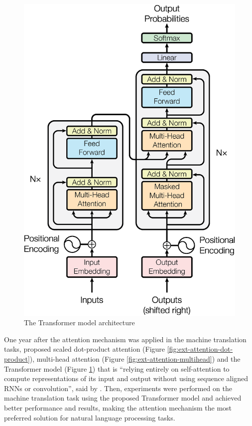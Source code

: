 \begin{minipage}[]{\textwidth}
\begin{minipage}[ht]{.52\textwidth}
\begin{figure}[H]
        \includegraphics[width=\textwidth]{literature/imgs/ext-transformer.png}
        \caption{The Transformer model architecture \cite{vaswani2017attention}}
        \label{fig:ext-transformer}
    \end{figure}
\end{minipage}
\end{minipage}

One year after the attention mechanism was applied in the machine translation tasks, \citet{vaswani2017attention} proposed scaled dot-product attention (Figure \ref{fig:ext-attention-dot-product}), multi-head attention (Figure \ref{fig:ext-attention-multihead}) and the Transformer model (Figure \ref{fig:ext-transformer}) that is ``relying entirely on self-attention to compute representations of its input and output without using sequence aligned RNNs or convolution'', said by \citet{vaswani2017attention}.
Then, experiments were performed on the machine translation task using the proposed Transformer model and achieved better performance and results, making the attention mechanism the most preferred solution for natural language processing tasks.

